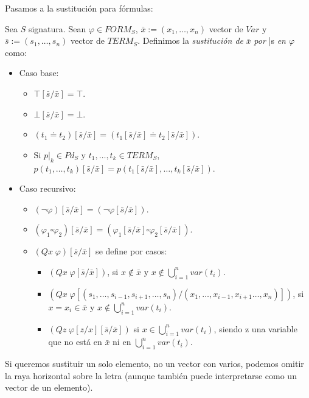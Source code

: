 Pasamos a la sustitución para fórmulas:
\begin{definition}
Sea $S$ signatura. Sean $\varphi \in FORM_S$, $\bar{x} := (x_1, \dots, x_n)$ vector de $Var$ y $\bar{s} := (s_1, \dots, s_n)$ vector de $TERM_S$. Definimos la \textit{sustitución de} $\bar{x}$ \textit{por} \bar{s} \textit{en $\varphi$} como:
\begin{itemize}
    \item Caso base:
    \begin{itemize}
        \item $\top[\bar{s}/\bar{x}]=\top$.
        \item $\bot[\bar{s}/\bar{x}]=\bot$.
        \item $(t_1\doteq t_2)[\bar{s}/\bar{x}]=(t_1[\bar{s}/\bar{x}]\doteq t_2[\bar{s}/\bar{x}])$.
        \item Si $p|_k\in Pd_S$ y $t_1,\dots,t_k\in TERM_S$, $p(t_1,\dots,t_k)[\bar{s}/\bar{x}]=p(t_1[\bar{s}/\bar{x}],\dots,t_k[\bar{s}/\bar{x}])$.
    \end{itemize}
    \item Caso recursivo:
    \begin{itemize}
        \item $(\neg\varphi)[\bar{s}/\bar{x}]=(\neg\varphi[\bar{s}/\bar{x}])$.
        \item $(\varphi_1\square\varphi_2)[\bar{s}/\bar{x}]=(\varphi_1[\bar{s}/\bar{x}]\square\varphi_2[\bar{s}/\bar{x}])$.
        \item $(Qx\;\varphi)[\bar{s}/\bar{x}]$ se define por casos:
        \begin{itemize}
            \item $(Qx\;\varphi[\bar{s}/\bar{x}])$, si $x\notin\bar{x}$ y $x\notin\bigcup_{i=1}^nvar(t_i)$.
            \item $(Qx\;\varphi[(s_1,\dots,s_{i-1},s_{i+1},\dots,s_n)/(x_1,\dots,x_{i-1},x_{i+1}\dots,x_n)])$, si $x=x_i\in\bar{x}$ y $x\notin\bigcup_{i=1}^nvar(t_i)$.
            \item $(Qz\;\varphi[z/x][\bar{s}/\bar{x}])$ si $x\in\bigcup_{i=1}^nvar(t_i)$, siendo z una variable que no está en $\bar{x}$ ni en $\bigcup_{i=1}^nvar(t_i)$.
        \end{itemize}
    \end{itemize}
\end{itemize}
\end{definition}

Si queremos sustituir un solo elemento, no un vector con varios, podemos omitir la raya horizontal sobre la letra (aunque también puede interpretarse como un vector de un elemento).\\


